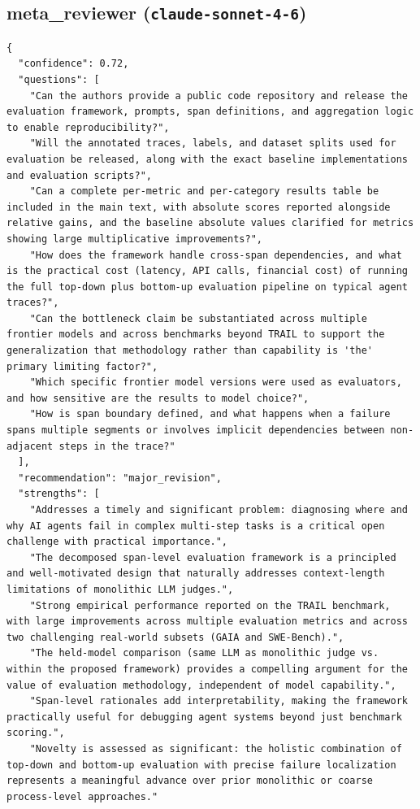 \documentclass[11pt]{article}
\begin{document}
\subsection*{meta_reviewer (\texttt{claude-sonnet-4-6})}
\begin{verbatim}
{
  "confidence": 0.72,
  "questions": [
    "Can the authors provide a public code repository and release the evaluation framework, prompts, span definitions, and aggregation logic to enable reproducibility?",
    "Will the annotated traces, labels, and dataset splits used for evaluation be released, along with the exact baseline implementations and evaluation scripts?",
    "Can a complete per-metric and per-category results table be included in the main text, with absolute scores reported alongside relative gains, and the baseline absolute values clarified for metrics showing large multiplicative improvements?",
    "How does the framework handle cross-span dependencies, and what is the practical cost (latency, API calls, financial cost) of running the full top-down plus bottom-up evaluation pipeline on typical agent traces?",
    "Can the bottleneck claim be substantiated across multiple frontier models and across benchmarks beyond TRAIL to support the generalization that methodology rather than capability is 'the' primary limiting factor?",
    "Which specific frontier model versions were used as evaluators, and how sensitive are the results to model choice?",
    "How is span boundary defined, and what happens when a failure spans multiple segments or involves implicit dependencies between non-adjacent steps in the trace?"
  ],
  "recommendation": "major_revision",
  "strengths": [
    "Addresses a timely and significant problem: diagnosing where and why AI agents fail in complex multi-step tasks is a critical open challenge with practical importance.",
    "The decomposed span-level evaluation framework is a principled and well-motivated design that naturally addresses context-length limitations of monolithic LLM judges.",
    "Strong empirical performance reported on the TRAIL benchmark, with large improvements across multiple evaluation metrics and across two challenging real-world subsets (GAIA and SWE-Bench).",
    "The held-model comparison (same LLM as monolithic judge vs. within the proposed framework) provides a compelling argument for the value of evaluation methodology, independent of model capability.",
    "Span-level rationales add interpretability, making the framework practically useful for debugging agent systems beyond just benchmark scoring.",
    "Novelty is assessed as significant: the holistic combination of top-down and bottom-up evaluation with precise failure localization represents a meaningful advance over prior monolithic or coarse process-level approaches."

\end{verbatim}
\end{document}
